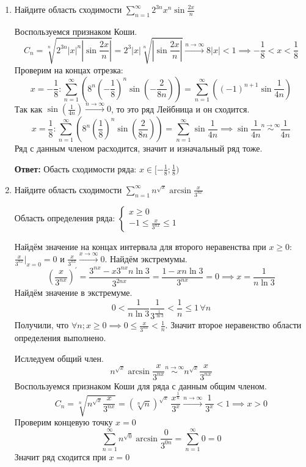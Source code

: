 \documentclass[10pt]{article} %
\begin{document}
\begin{large}
\begin{enumerate}
\item Найдите область сходимости $ \sum\limits_{n=1}^{\infty}2^{3n}x^n \sin \frac{2x}{n} $

Воспользуемся признаком Коши.
\[ C_{n} = \sqrt[n]{ 2^{3n} |x|^n \left| \sin \frac{2x}{n} \right| } = 2^3 |x| \sqrt[n]{\left| \sin \frac{2x}{n} \right|} 
\xrightarrow{n\to\infty} 8 |x| < 1 \implies -\frac{1}{8} < x < \frac{1}{8} \]
Проверим на концах отрезка:
\[ x = -\frac{1}{8}: \sum_{n=1}^{\infty} \left( 8^{n} \left( -\frac{1}{8} \right)^n \sin \left( -\frac{2}{8n} \right) \right) = \sum_{n=1}^{\infty} \left( (-1)^{n+1} \sin \frac{1}{4n} \right)  \]
Так как $ \sin(\frac{1}{4n}) \xrightarrow{n\to\infty} 0 $, то это ряд Лейбница и он сходится.
\[ x = \frac{1}{8}: \sum_{n=1}^{\infty} \left( 8^{n} \left( \frac{1}{8} \right)^n \sin \left( \frac{2}{8n} \right) \right) = \sum_{n=1}^{\infty} \sin \frac{1}{4n} \implies
 \sin \frac{1}{4n} \stackrel{n\to\infty}{\sim} \frac{1}{4n} \]
Ряд с данным членом расходится, значит и изначальный ряд тоже.

\textbf{Ответ:} Обасть сходимости ряда: $ x \in [ -\frac{1}{8}; \frac{1}{8} ) $

\item Найдите область сходимости $ \sum\limits_{n=1}^{\infty} n^{\sqrt{x}} \arcsin \frac{x}{3^{nx}} $

Область определения ряда:
$
\begin{cases}
    x \geq 0 \\
    -1 \leq \frac{x}{3^{nx}} \leq 1
\end{cases}
$

Найдём значение на концах интервала для второго неравенства при $x \geq 0: $ $ \frac{x}{3^{nx}} |_{x=0} = 0 $ и $ \frac{x}{3^{nx}} \xrightarrow{x\to\infty} 0 $.
Найдём экстремумы.
\[ \left( \frac{x}{3^{nx}} \right)^{'} = \frac{3^{nx} - x 3^{nx} n \ln 3}{3^{2nx}} = \frac{1-xn \ln3}{3^{nx}} = 0 \implies x = \frac{1}{n \ln3} \]
Найдём значение в экстремуме.
\[ 0 < \frac{1}{n\ln3} \frac{1}{3^{\frac{1}{\ln3}}} < \frac{1}{n} \leq 1 \, \forall n  \]
Получили, что $ \forall n; x \geq 0 \implies 0 \leq \frac{x}{3^{nx}} < \frac{1}{n}$. Значит второе неравенство области определения выполнено.

Ислледуем общий член.
\[ n^{\sqrt{x}} \arcsin \frac{x}{3^{nx}} \stackrel{n\to\infty}{\sim} n^{\sqrt{x}} \frac{x}{3^{nx}} \]
Воспользуемся признаком Коши для ряда с данным общим членом.
\[ C_n = \sqrt[n]{n^{\sqrt{x}} \frac{x}{3^{nx}}} =
(\sqrt[n]{n})^{\sqrt{x}} \, \frac{x^{\frac{1}{n}}}{3^x} \xrightarrow{n\to\infty} \frac{1}{3^x} < 1 \implies x > 0 \]
Проверим концевую точку $ x = 0 $
\[ \sum_{n=1}^{\infty} n^{\sqrt{0}} \arcsin \frac{0}{3^{0n}} = \sum_{n=1}^{\infty} 0 = 0  \]
Значит ряд сходится при $x = 0$


\end{enumerate}
\end{large}
\end{document}
